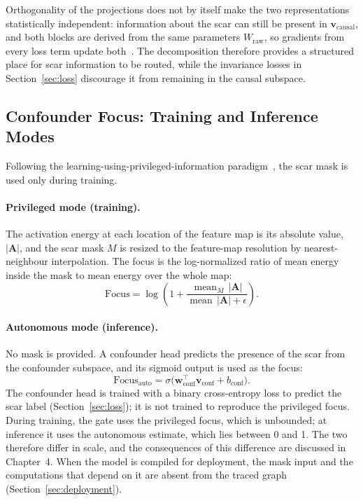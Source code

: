 Orthogonality of the projections does not by itself make the two representations statistically independent: information about the scar can still be present in $\mathbf{v}_{\text{causal}}$, and both blocks are derived from the same parameters $W_{\text{raw}}$, so gradients from every loss term update both~\cite{sarhan2020, huang2018}. The decomposition therefore provides a structured place for scar information to be routed, while the invariance losses in Section~\ref{sec:loss} discourage it from remaining in the causal subspace.

\subsection{Confounder Focus: Training and Inference Modes}
Following the learning-using-privileged-information paradigm~\cite{vapnik2009, vapnik2015}, the scar mask is used only during training.

\paragraph{Privileged mode (training).} The activation energy at each location of the feature map is its absolute value, $|\mathbf{A}|$, and the scar mask $M$ is resized to the feature-map resolution by nearest-neighbour interpolation. The focus is the log-normalized ratio of mean energy inside the mask to mean energy over the whole map:
\begin{equation}
\text{Focus} = \log\!\left(1 + \frac{\operatorname{mean}_{M}\,|\mathbf{A}|}{\operatorname{mean}\,|\mathbf{A}| + \epsilon}\right).
\end{equation}

\paragraph{Autonomous mode (inference).} No mask is provided. A confounder head predicts the presence of the scar from the confounder subspace, and its sigmoid output is used as the focus:
\begin{equation}
\text{Focus}_{\text{auto}} = \sigma\bigl(\mathbf{w}_{\text{conf}}^{\top}\mathbf{v}_{\text{conf}} + b_{\text{conf}}\bigr).
\end{equation}
The confounder head is trained with a binary cross-entropy loss to predict the scar label (Section~\ref{sec:loss}); it is not trained to reproduce the privileged focus. During training, the gate uses the privileged focus, which is unbounded; at inference it uses the autonomous estimate, which lies between 0 and 1. The two therefore differ in scale, and the consequences of this difference are discussed in Chapter~4. When the model is compiled for deployment, the mask input and the computations that depend on it are absent from the traced graph (Section~\ref{sec:deployment}).

